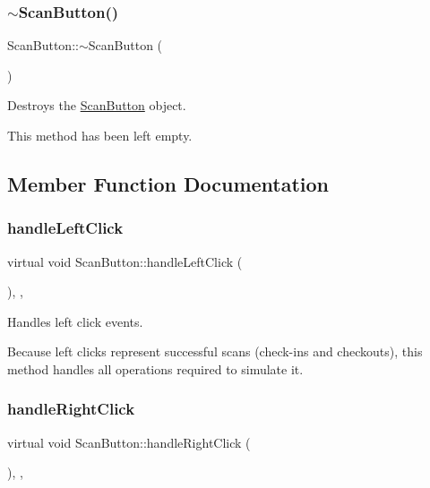 \subsubsection{\texorpdfstring{$\sim$\+Scan\+Button()}{~ScanButton()}}
{\footnotesize\ttfamily Scan\+Button\+::$\sim$\+Scan\+Button (\begin{DoxyParamCaption}{ }\end{DoxyParamCaption})}



Destroys the \hyperlink{classScanButton}{Scan\+Button} object. 

This method has been left empty. 

\subsection{Member Function Documentation}
\mbox{\label{classScanButton_a41e30224cc4068cb4cb23341561c41fa}} 
\subsubsection{\texorpdfstring{handle\+Left\+Click}{handleLeftClick}}
{\footnotesize\ttfamily virtual void Scan\+Button\+::handle\+Left\+Click (\begin{DoxyParamCaption}{ }\end{DoxyParamCaption})\hspace{0.3cm}{\ttfamily [protected]}, {\ttfamily [virtual]}, {\ttfamily [slot]}}



Handles left click events. 

Because left clicks represent successful scans (check-\/ins and checkouts), this method handles all operations required to simulate it. \mbox{\label{classScanButton_a1ee18ddda87535b007a2eca7899d0879}} 
\subsubsection{\texorpdfstring{handle\+Right\+Click}{handleRightClick}}
{\footnotesize\ttfamily virtual void Scan\+Button\+::handle\+Right\+Click (\begin{DoxyParamCaption}{ }\end{DoxyParamCaption})\hspace{0.3cm}{\ttfamily [protected]}, {\ttfamily [virtual]}, {\ttfamily [slot]}}



